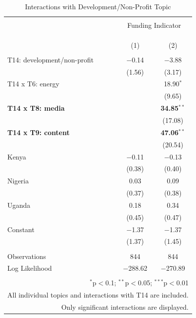 \documentclass[12pt]{article}
\begin{document}
\begin{table}[!htbp] \centering 
  \caption{Interactions with Development/Non-Profit Topic} 
  \label{} 
\scriptsize 
\begin{tabular}{@{\extracolsep{5pt}}lcc} 
\\[-1.8ex]\hline 
\hline \\[-1.8ex] 
 & \multicolumn{2}{c}{Funding Indicator} \\ 
\cline{2-3} 
\\[-1.8ex] & \multicolumn{2}{c}{} \\ 
\\[-1.8ex] & (1) & (2)\\ 
\hline \\[-1.8ex] 
  T14: development/non-profit & $-$0.14 & $-$3.88 \\ 
  & (1.56) & (3.17) \\ 
  T14 x T6: energy &  & 18.90$^{*}$ \\ 
  &  & (9.65) \\ 
  \textbf{T14 x T8: media} &  & \textbf{34.85}$^{**}$ \\ 
  &  & (17.08) \\ 
   \textbf{T14 x T9: content} &  & \textbf{47.06}$^{**}$ \\ 
  &  & (20.54) \\ 
  Kenya & $-$0.11 & $-$0.13 \\ 
  & (0.38) & (0.40) \\ 
  Nigeria & 0.03 & 0.09 \\ 
  & (0.37) & (0.38) \\ 
  Uganda & 0.18 & 0.34 \\ 
  & (0.45) & (0.47) \\ 
  Constant & $-$1.37 & $-$1.37 \\ 
  & (1.37) & (1.45) \\ 
 \hline \\[-1.8ex] 
Observations & 844 & 844 \\ 
Log Likelihood & $-$288.62 & $-$270.89 \\ 
\hline 
\hline \\[-1.8ex] 
 \multicolumn{3}{r}{$^{*}$p$<$0.1; $^{**}$p$<$0.05; $^{***}$p$<$0.01} \\ 
 \multicolumn{3}{r}{ \scriptsize{All individual topics and interactions with T14 are included.}} \\ 
 \multicolumn{3}{r}{\scriptsize{Only significant interactions are displayed.}} \\ 
\end{tabular} 
\end{table} 
\end{document}
